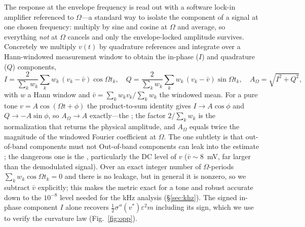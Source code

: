 \documentclass[11pt,a4paper]{article}
\newcommand{\Sig}{\sigma}
\newcommand{\half}{\tfrac{1}{2}}
\providecommand{\DIFaddtex}[1]{{\protect\color{blue} \sf #1}} %
\providecommand{\DIFdeltex}[1]{{\protect\color{red} \scriptsize #1}} %
\providecommand{\DIFaddbegin}{} %
\providecommand{\DIFaddend}{} %
\providecommand{\DIFdelbegin}{} %
\providecommand{\DIFdelend}{} %
\providecommand{\DIFadd}[1]{\texorpdfstring{\DIFaddtex{#1}}{#1}} %
\providecommand{\DIFdel}[1]{\texorpdfstring{\DIFdeltex{#1}}{}} %
\begin{document}
The response at the envelope frequency is read out with a software lock-in
amplifier referenced to $\Omega$---a standard way to isolate the component of a signal
at one chosen frequency: multiply by sine and cosine at $\Omega$ and average, so
everything \emph{not} at $\Omega$ cancels and only the envelope-locked amplitude
survives. Concretely we multiply $v(t)$ by quadrature references and
integrate over a Hann-windowed measurement window to obtain the in-phase ($I$) and
quadrature ($Q$) components,
\begin{equation}
I=\frac{2}{\sum_k w_k}\sum_k w_k\,(v_k-\bar v)\cos\Omega t_k,\quad
Q=\frac{2}{\sum_k w_k}\sum_k w_k\,(v_k-\bar v)\sin\Omega t_k,\quad
A_\Omega=\sqrt{I^2+Q^2},
\label{eq:lockin}
\end{equation}
with $w$ a Hann window and $\bar v=\sum_k w_k v_k/\sum_k w_k$ the windowed mean.
For a pure tone $v=A\cos(\Omega t+\phi)$ the product-to-sum identity gives
$I\to A\cos\phi$ and $Q\to -A\sin\phi$, so $A_\Omega\to A$\DIFdelbegin \DIFdel{exactly---the }\DIFdelend \DIFaddbegin \DIFadd{; the }\DIFaddend factor
$2/\sum_k w_k$ is the normalization that returns the physical amplitude, and
$A_\Omega$ equals twice the magnitude of the windowed Fourier coefficient at
$\Omega$. \DIFdelbegin \DIFdel{The one subtlety is that out-of-band components must not }\DIFdelend \DIFaddbegin \DIFadd{Out-of-band components can }\DIFaddend leak into the estimate\DIFdelbegin \DIFdel{; the dangerous one is the }\DIFdelend \DIFaddbegin \DIFadd{, particularly the }\DIFaddend DC level of $v$ ($\bar v\!\sim\!8$~mV, far
larger than the demodulated signal). Over an exact integer number of
$\Omega$-periods $\sum_k w_k\cos\Omega t_k=0$ and there is no leakage, but in
general it is nonzero, so we subtract $\bar v$ explicitly; this makes the metric
\DIFdelbegin \DIFdel{exact for a tone and robust }\DIFdelend \DIFaddbegin \DIFadd{accurate }\DIFaddend down to the $10^{-8}$ level needed for the kHz
analysis (\S\ref{sec:khz}). The signed in-phase component $I$ alone recovers
$\half\Sig''(v^*)\varepsilon^2 m$ including its sign, which we use to verify the
curvature law (Fig.~\ref{fig:opp}).
\end{document}
